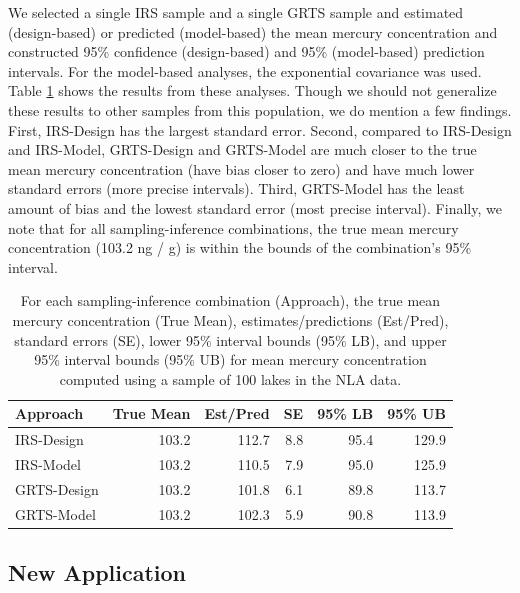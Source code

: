 \documentclass[]{elsarticle} %
\begin{document}
We selected a single IRS sample and a single GRTS sample and estimated
(design-based) or predicted (model-based) the mean mercury concentration
and constructed 95\% confidence (design-based) and 95\% (model-based)
prediction intervals. For the model-based analyses, the exponential
covariance was used. Table \ref{tab:appliedtab} shows the results from
these analyses. Though we should not generalize these results to other
samples from this population, we do mention a few findings. First,
IRS-Design has the largest standard error. Second, compared to
IRS-Design and IRS-Model, GRTS-Design and GRTS-Model are much closer to
the true mean mercury concentration (have bias closer to zero) and have
much lower standard errors (more precise intervals). Third, GRTS-Model
has the least amount of bias and the lowest standard error (most precise
interval). Finally, we note that for all sampling-inference
combinations, the true mean mercury concentration (103.2 ng / g) is
within the bounds of the combination's 95\% interval.

\begin{table}[ht]
\centering
\begin{tabular}{lrrrrr}
  \hline
Approach & True Mean & Est/Pred & SE & 95\% LB & 95\% UB \\ 
  \hline
IRS-Design & 103.2 & 112.7 & 8.8 & 95.4 & 129.9 \\ 
  IRS-Model & 103.2 & 110.5 & 7.9 & 95.0 & 125.9 \\ 
  GRTS-Design & 103.2 & 101.8 & 6.1 & 89.8 & 113.7 \\ 
  GRTS-Model & 103.2 & 102.3 & 5.9 & 90.8 & 113.9 \\ 
   \hline
\end{tabular}
\caption{\label{tab:appliedtab} For each sampling-inference combination (Approach), the true mean mercury concentration (True Mean), estimates/predictions (Est/Pred), standard errors (SE), lower 95\% interval bounds (95\% LB), and upper 95\% interval bounds (95\% UB) for mean mercury concentration computed using a sample of 100 lakes in the NLA data.} 
\end{table}

\hypertarget{new-application}{%
\subsection{New Application}\label{new-application}}
\end{document}
